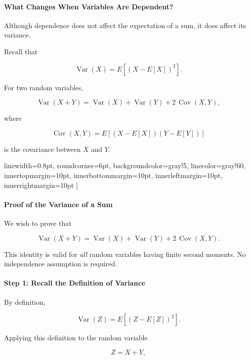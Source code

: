 \documentclass[11pt]{article}
\begin{document}
\begin{mdframed}[
		linewidth=0.8pt,
		roundcorner=6pt,
		backgroundcolor=gray!5,
		linecolor=gray!60,
		innertopmargin=10pt,
		innerbottommargin=10pt,
		innerleftmargin=10pt,
		innerrightmargin=10pt
		]
		\bigskip
		
		\paragraph{What Changes When Variables Are Dependent?}
		
		Although dependence does not affect the expectation of a sum, it does affect
		its variance.
		
		Recall that
		
		\[
		\operatorname{Var}(X)
		=
		E[(X-E[X])^2].
		\]
		
		For two random variables,
		
		\[
		\boxed{
			\operatorname{Var}(X+Y)
			=
			\operatorname{Var}(X)
			+
			\operatorname{Var}(Y)
			+
			2\,\operatorname{Cov}(X,Y),
		}
		\]
		
		where
		
		\[
		\operatorname{Cov}(X,Y)
		=
		E[(X-E[X])(Y-E[Y])]
		\]
		
		is the covariance between \(X\) and \(Y\).
		
		linewidth=0.8pt,
		roundcorner=6pt,
		backgroundcolor=gray!5,
		linecolor=gray!60,
		innertopmargin=10pt,
		innerbottommargin=10pt,
		innerleftmargin=10pt,
		innerrightmargin=10pt
		]
		
		\paragraph{Proof of the Variance of a Sum}
		
		We wish to prove that
		
		\[
		\boxed{
			\operatorname{Var}(X+Y)
			=
			\operatorname{Var}(X)
			+
			\operatorname{Var}(Y)
			+
			2\,\operatorname{Cov}(X,Y).
		}
		\]
		
		This identity is valid for \emph{all} random variables having finite second
		moments. No independence assumption is required.
		
		\bigskip
		
		\paragraph{Step 1: Recall the Definition of Variance}
		
		By definition,
		
		\[
		\operatorname{Var}(Z)
		=
		E\!\left[(Z-E[Z])^2\right].
		\]
		
		Applying this definition to the random variable
		
		\[
		Z=X+Y,
		\]
		

\end{mdframed}
\end{document}
